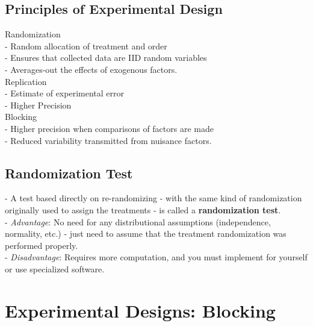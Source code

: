 \documentclass[11pt,a4paper]{article}
\begin{document}
\subsection{ Principles of Experimental Design}
Randomization\\
- Random allocation of treatment and order\\
- Ensures that collected data are IID random variables\\
- Averages-out the effects of exogenous factors.\\

Replication\\
- Estimate of experimental error\\
- Higher Precision\\

Blocking\\
- Higher precision when comparisons of factors are made\\
- Reduced variability transmitted from nuisance factors.\\


\subsection{ Randomization Test}
- A test based directly on re-randomizing - with the same kind of randomization originally used to assign the treatments - is called a \textbf{randomization test}.\\

- \textit{Advantage}: No need for any distributional assumptions (independence, normality, etc.) - just need to assume that the treatment randomization was performed properly.\\
- \textit{Disadvantage}: Requires more computation, and you must implement for yourself or use specialized software.

\section{ Experimental Designs: Blocking}
\end{document}
